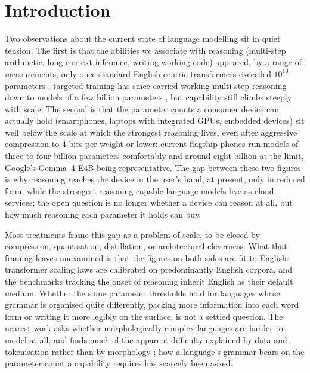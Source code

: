 \section{Introduction}
\label{sec:intro}

Two observations about the current state of language modelling sit in quiet tension. The first is that the abilities we associate with reasoning (multi-step arithmetic, long-context inference, writing working code) appeared, by a range of measurements, only once standard English-centric transformers exceeded $10^{10}$ parameters \citep{wei2022}; targeted training has since carried working multi-step reasoning down to models of a few billion parameters \citep{deepseekr1, qwen3, phi4minireasoning}, but capability still climbs steeply with scale. The second is that the parameter counts a consumer device can actually hold (smartphones, laptops with integrated GPUs, embedded devices) sit well below the scale at which the strongest reasoning lives, even after aggressive compression to 4 bits per weight or lower: current flagship phones run models of three to four billion parameters comfortably and around eight billion at the limit, Google's Gemma~4 E4B \citep{gemma4} being representative. The gap between these two figures is why reasoning reaches the device in the user's hand, at present, only in reduced form, while the strongest reasoning-capable language models live as cloud services; the open question is no longer whether a device can reason at all, but how much reasoning each parameter it holds can buy.

Most treatments frame this gap as a problem of scale, to be closed by compression, quantisation, distillation, or architectural cleverness. What that framing leaves unexamined is that the figures on both sides are fit to English: transformer scaling laws \citep{kaplan2020, hoffmann2022} are calibrated on predominantly English corpora, and the benchmarks tracking the onset of reasoning inherit English as their default medium. Whether the same parameter thresholds hold for languages whose grammar is organised quite differently, packing more information into each word form or writing it more legibly on the surface, is not a settled question. The nearest work asks whether morphologically complex languages are harder to model at all, and finds much of the apparent difficulty explained by data and tokenisation rather than by morphology \citep{arnett2025, poelman2025}; how a language's grammar bears on the parameter count a capability requires has scarcely been asked.

